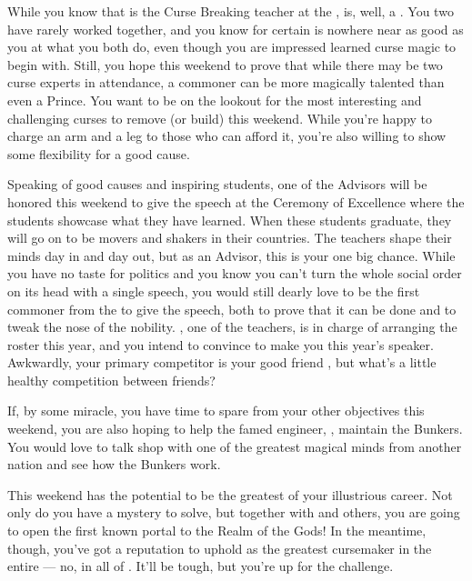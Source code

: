 \documentclass[char]{GL2020}
\begin{document}
While you know that \cPrince{\intro} is the Curse Breaking teacher at the \pSc{}, \cPrince{} is, well, a \cPrince{\Heir}. You two have rarely worked together, and you know for certain \cPrince{} is nowhere near as good as you at what you both do, even though you are impressed \cPrince{\they} learned curse magic to begin with. Still, you hope this weekend to prove that while there may be two curse experts in attendance, a commoner can be more magically talented than even a Prince. You want to be on the lookout for the most interesting and challenging curses to remove (or build) this weekend. While you're happy to charge an arm and a leg to those who can afford it, you're also willing to show some flexibility for a good cause.

Speaking of good causes and inspiring students, one of the Advisors will be honored this weekend to give the speech at the Ceremony of Excellence where the students showcase what they have learned. When these students graduate, they will go on to be movers and shakers in their countries. The teachers shape their minds day in and day out, but as an Advisor, this is your one big chance. While you have no taste for politics and you know you can't turn the whole social order on its head with a single speech, you would still dearly love to be the first commoner from the \pFarm{} to give the speech, both to prove that it can be done and to tweak the nose of the nobility. \cMusic{\intro}, one of the teachers, is in charge of arranging the roster this year, and you intend to convince \cMusic{\them} to make you this year's speaker. Awkwardly, your primary competitor is your good friend \cHedonist{}, but what's a little healthy competition between friends?

If, by some miracle, you have time to spare from your other objectives this weekend, you are also hoping to help the famed \pShippie{} engineer, \cBunker{}, maintain the Bunkers. You would love to talk shop with one of the greatest magical minds from another nation and see how the Bunkers work.

This weekend has the potential to be the greatest of your illustrious career. Not only do you have a mystery to solve, but together with \cFlowPriest{} and others, you are going to open the first known portal to the Realm of the Gods! In the meantime, though, you've got a reputation to uphold as the greatest cursemaker in the entire \pFarm{} — no, in all of \pEarth{}. It'll be tough, but you're up for the challenge.
\end{document}
